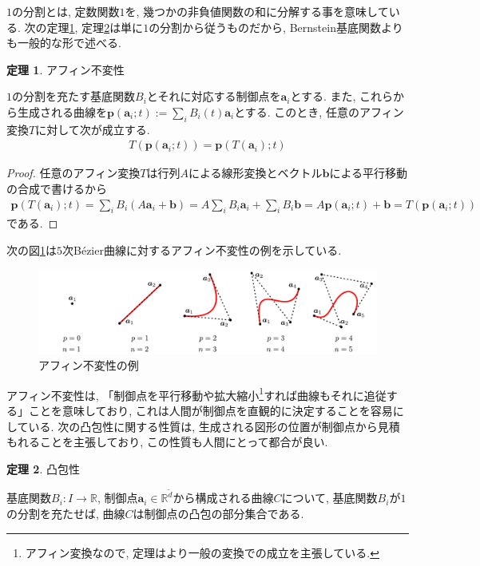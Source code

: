 \documentclass{jsarticle}
\newcommand\setR{\mathbb{R}}
\theoremstyle{definition}%
\newtheorem{thm}{定理}
\begin{document}
\newpage
$1$の分割とは, 定数関数$1$を, 幾つかの非負値関数の和に分解する事を意味している.
次の定理\ref{affine}, 定理\ref{convex}は単に$1$の分割から従うものだから, Bernstein基底関数よりも一般的な形で述べる.
\begin{screen}
	\begin{thm}
		\label{affine}
		アフィン不変性\footnotemark

		$1$の分割を充たす基底関数$B_i$とそれに対応する制御点を$\bm{a}_i$とする.
		また, これらから生成される曲線を$\displaystyle\bm{p}(\bm{a}_i;t):=\sum_i B_i(t)\bm{a}_i$とする.
		このとき, 任意のアフィン変換$T$に対して次が成立する.
		\begin{align}
			T(\bm{p}(\bm{a}_i;t))=\bm{p}(T(\bm{a}_i);t)
		\end{align}
	\end{thm}
\end{screen}
\begin{proof}
	任意のアフィン変換$T$は行列$A$による線形変換とベクトル$\bm{b}$による平行移動の合成で書けるから
	\begin{align}
		\bm{p}(T(\bm{a}_i);t)
		=\sum_iB_i(A\bm{a}_i+\bm{b})
		=A\sum_iB_i\bm{a}_i+\sum_iB_i\bm{b}
		=A\bm{p}(\bm{a}_i;t)+\bm{b}
		=T(\bm{p}(\bm{a}_i;t))
	\end{align}
	である.
\end{proof}
次の図\ref{Fig130}は$5$次B\'{e}zier曲線に対するアフィン不変性の例を示している.
\begin{figure}[H]
	\centering
    \includegraphics[page=13,clip,width=135mm]{fig.pdf}
	\caption{アフィン不変性の例}
	\label{Fig130}
\end{figure}
アフィン不変性は, 「制御点を平行移動や拡大縮小\footnote{アフィン変換なので, 定理はより一般の変換での成立を主張している.}すれば曲線もそれに追従する」ことを意味しており, これは人間が制御点を直観的に決定することを容易にしている.
次の凸包性に関する性質は, 生成される図形の位置が制御点から見積もれることを主張しており, この性質も人間にとって都合が良い.
\begin{screen}
	\begin{thm}
        \label{convex}
		凸包性

		基底関数$B_i:I\to \setR$, 制御点$\bm{a}_i\in \setR^{\tilde{d}}$から構成される曲線$C$について, 基底関数$B_i$が$1$の分割を充たせば, 曲線$C$は制御点の凸包の部分集合である.
	\end{thm}
\end{screen}
\end{document}
